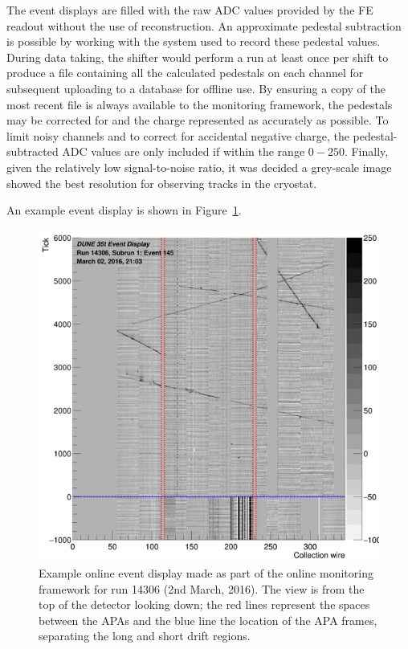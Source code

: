 The event displays are filled with the raw ADC values provided by the FE readout without the use of reconstruction.  An approximate pedestal subtraction is possible by working with the system used to record these pedestal values.  During data taking, the shifter would perform a run at least once per shift to produce a file containing all the calculated pedestals on each channel for subsequent uploading to a database for offline use.  By ensuring a copy of the most recent file is always available to the monitoring framework, the pedestals may be corrected for and the charge represented as accurately as possible.  To limit noisy channels and to correct for accidental negative charge, the pedestal-subtracted ADC values are only included if within the range $0-250$.  Finally, given the relatively low signal-to-noise ratio, it was decided a grey-scale image showed the best resolution for observing tracks in the cryostat.

An example event display is shown in Figure~\ref{fig:EVD}.

\begin{figure}
  \centering
  \includegraphics[width=14cm]{evd.png}
  \caption[Example online event display made by the Online Monitoring framework.]{Example online event display made as part of the online monitoring framework for run 14306 (2nd March, 2016).  The view is from the top of the detector looking down; the red lines represent the spaces between the APAs and the blue line the location of the APA frames, separating the long and short drift regions.}
  \label{fig:EVD}
\end{figure}


